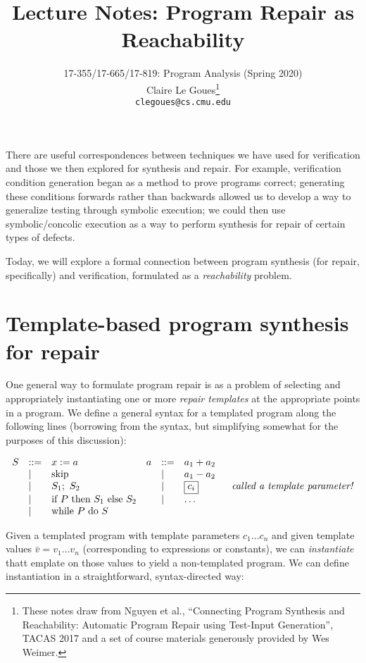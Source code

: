 \documentclass[11pt]{article}
\title{Lecture Notes: Program Repair as Reachability}
\author{17-355/17-665/17-819: Program Analysis (Spring 2020)\\
  Claire Le Goues\footnote{These notes draw from Nguyen et al., ``Connecting
    Program Synthesis and Reachability: Automatic Program Repair using
    Test-Input Generation'', TACAS 2017 and
    a set of course materials generously provided by Wes Weimer.}\\
  {\tt clegoues@cs.cmu.edu}}
\date{}
\begin{document}
\maketitle
There are useful correspondences between techniques we have used for
verification and those we then explored for synthesis and repair. For example,
verification condition generation began as a method to prove programs correct;
generating these conditions forwards rather than backwards allowed us to develop
a way to generalize testing through symbolic execution; we could then use
symbolic/concolic execution as a way to perform synthesis for repair of certain
types of defects.

Today, we will explore a formal connection between program synthesis (for
repair, specifically) and verification, formulated as a \emph{reachability}
problem.

\section{Template-based program synthesis for repair}

One general way to formulate program repair is as a problem of selecting and
appropriately instantiating one or more \emph{repair templates} at the
appropriate points in a program. We define a general syntax for a templated
program along the following lines (borrowing from the \WhileLang syntax, but
simplifying somewhat for the purposes of this discussion):

\newcommand\df{\bnfdef}
\newcommand\da{\bnfalt}
\newcommand\skips{\mbox{skip}}
\newcommand\ifs{\mbox{if}~ P ~\mbox{then}~ S_1 ~\mbox{else}~ S_2}
\newcommand\whiles{\mbox{while}~ P ~\mbox{do}~ S}

\[
\begin{array}{llllllllllllll}

S & \df & x := a    & a & \df & a_1 + a_2 \\
  & \da & \skips    &   & \da & a_1 - a_2 \\ 
  & \da & S_1;~ S_2 &   & \da & \fbox{$\displaystyle c_i $}  & \mbox{~~\emph{called a template parameter!}}\\
  & \da & \ifs      &   & \da & \ldots \\
  & \da & \whiles   &   & \\
\end{array}
\]


Given a templated program with template parameters $c_1 \ldots c_n$ and given
template values $\bar{v} = v_1 \ldots v_n$ (corresponding to expressions or
constants), we can \emph{instantiate} thatt emplate on those values to yield a
non-templated program. We can define instantiation in a straightforward,
syntax-directed way:
\end{document}
